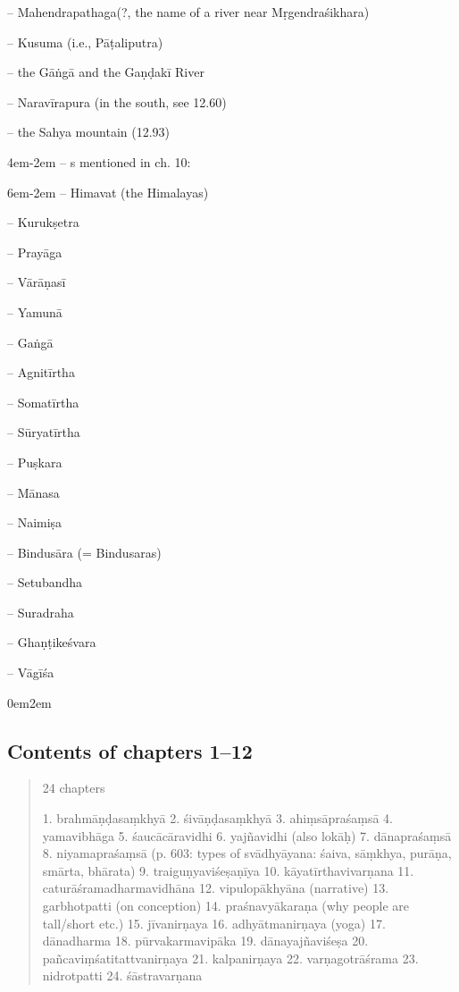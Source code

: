\documentclass[11pt]{book}
\begin{document}
-- Mahendrapathaga(?, the name of a river near Mṛgendraśikhara)

-- Kusuma (i.e., Pāṭaliputra)

-- the Gāṅgā and the Gaṇḍakī River

-- Naravīrapura (in the south, see 12.60)

-- the Sahya mountain (12.93)

\leftskip4em\parindent-2em
-- s mentioned in ch. 10:

\leftskip6em\parindent-2em
    -- Himavat (the Himalayas)
    
	-- Kurukṣetra
	
	-- Prayāga
	
	-- Vārāṇasī
 	
 	-- Yamunā
 	
 	-- Gaṅgā
 	
 	-- Agnitīrtha %
 	
 	-- Somatīrtha %
 	
 	-- Sūryatīrtha %
 	
 	-- Puṣkara %
 	
 	-- Mānasa %
    
    -- Naimiṣa %
    
    -- Bindusāra (= Bindusaras) %
    
    -- Setubandha %
    
    -- Suradraha %
    
    -- Ghaṇṭikeśvara
    
    -- Vāgīśa





\leftskip0em\parindent2em


\vfill
\pagebreak

\subsection{Contents of chapters 1--12}

\begin{quote}
  24 chapters

  1. brahmāṇḍasaṃkhyā 
  2. śivāṇḍasaṃkhyā 
  3. ahiṃsāpraśaṃsā 
  4. yamavibhāga
  5. śaucācāravidhi
  6. yajñavidhi (also lokāḥ)
  7. dānapraśaṃsā 
  8. niyamapraśaṃsā (p. 603: types of svādhyāyana: śaiva, sāṃkhya, purāṇa,
                    smārta, bhārata)
  9. traiguṇyaviśeṣaṇīya
  10. kāyatīrthavivarṇana
  11. caturāśramadharmavidhāna 
  12. vipulopākhyāna  (narrative)
  13. garbhotpatti (on conception)
  14. praśnavyākaraṇa (why people are tall/short etc.)
  15. jīvanirṇaya 
  16. adhyātmanirṇaya (yoga) 
  17. dānadharma
  18. pūrvakarmavipāka
  19. dānayajñaviśeṣa
  20. pañcaviṃśatitattvanirṇaya
  21. kalpanirṇaya
  22. varṇagotrāśrama
  23. nidrotpatti
  24. śāstravarṇana
\end{quote}
\end{document}
